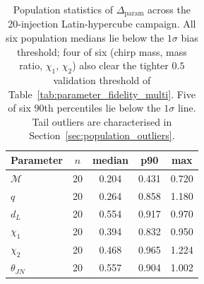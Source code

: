 \documentclass[12pt]{article}
\begin{document}
\begin{table}[htbp]
    \centering
    \begin{tabular}{l c c c c}
        \hline\hline
        \textbf{Parameter} & $n$ & \textbf{median} & \textbf{p90} & \textbf{max} \\
        \hline
        $\mathcal{M}$               & 20 & 0.204 & 0.431 & 0.720 \\
        $q$                         & 20 & 0.264 & 0.858 & 1.180 \\
        $d_L$                       & 20 & 0.554 & 0.917 & 0.970 \\
        $\chi_1$                    & 20 & 0.394 & 0.832 & 0.950 \\
        $\chi_2$                    & 20 & 0.468 & 0.965 & 1.224 \\
        $\theta_{JN}$               & 20 & 0.557 & 0.904 & 1.002 \\
        \hline\hline
    \end{tabular}
    \caption[Population statistics.]{Population statistics of $\Delta_{\mathrm{param}}$ across the 20-injection Latin-hypercube campaign. All six population medians lie below the $1\sigma$ bias threshold; four of six (chirp mass, mass ratio, $\chi_1$, $\chi_2$) also clear the tighter $0.5$ validation threshold of Table~\ref{tab:parameter_fidelity_multi}. Five of six $90$th percentiles lie below the $1\sigma$ line. Tail outliers are characterised in Section~\ref{sec:population_outliers}.}
    \label{tab:population_summary}
\end{table}
\end{document}

